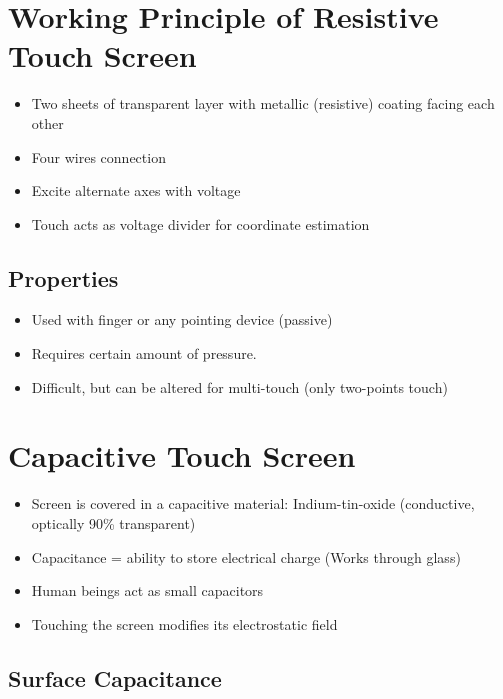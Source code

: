\documentclass{article}
\begin{document}
\section{Working Principle of Resistive Touch Screen}

\begin{itemize}
  \item Two sheets of transparent layer with metallic (resistive) coating facing each other
  \item Four wires connection
  \item Excite alternate axes with voltage
  \item Touch acts as voltage divider for coordinate estimation
\end{itemize}

\subsection{Properties}

\begin{itemize}
  \item Used with finger or any pointing device (passive)
  \item Requires certain amount of pressure.
  \item Difficult, but can be altered for multi-touch (only two-points touch)
\end{itemize}

\section{Capacitive Touch Screen}

\begin{itemize}  
  \item Screen is covered in a capacitive material: Indium-tin-oxide (conductive, optically 90\% transparent)
  \item Capacitance = ability to store electrical charge (Works through glass)
  \item Human beings act as small capacitors
  \item Touching the screen modifies its electrostatic field
\end{itemize}

\subsection{Surface Capacitance}
\end{document}
